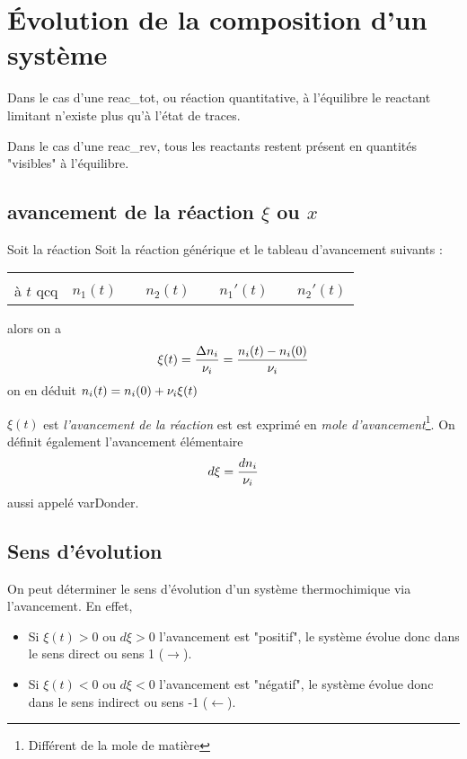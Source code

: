 \section{\'Evolution de la composition d'un système}
Dans le cas d'une \gls{reac_tot}, ou réaction quantitative, à l'équilibre le \gls{reactant} limitant n'existe plus qu'à l'état de traces.

Dans le cas d'une \gls{reac_rev}, tous les \glspl{reactant} restent présent en quantités "visibles" à l'équilibre.

\subsection{\Gls{avancement} de la réaction $\xi$ ou $x$}

Soit la réaction 
Soit la réaction générique et le tableau d'avancement suivants :
\begin{center}
	\begin{tabular}{cccccccc}
		&\reacStdTab{}\\[0.1cm]
		à $t$ qcq & $n_1(t)$ && $n_2(t)$ && $n_1'(t)$ && $n_2'(t)$\\
	\end{tabular}
\end{center}
alors on a
$$\xi(t) = \frac{\Delta n_i}{\nu_i} = \frac{n_i(t) - n_i(0)}{\nu_i}$$
on en déduit $n_i(t) = n_i(0) + \nu_i \xi (t)$

$\xi(t)$ est \emph{l'\gls{avancement} de la réaction} est est exprimé en \emph{mole d'avancement}\footnote{Différent de la mole de matière}. On définit également l'avancement élémentaire
$$d\xi=\frac{dn_i}{\nu_i}$$
aussi appelé \gls{varDonder}.

\subsection{Sens d'évolution}
On peut déterminer le sens d'évolution d'un système thermochimique via l'\gls{avancement}. En effet, 
\begin{itemize}
	\item Si $\xi(t) > 0$ ou $d\xi>0$ l'avancement est "positif", le système évolue donc dans le sens direct ou sens 1 ($\rightarrow$).
	\item Si $\xi(t) < 0$ ou $d\xi<0$ l'avancement est "négatif", le système évolue donc dans le sens indirect ou sens -1 ($\leftarrow$).
\end{itemize}

